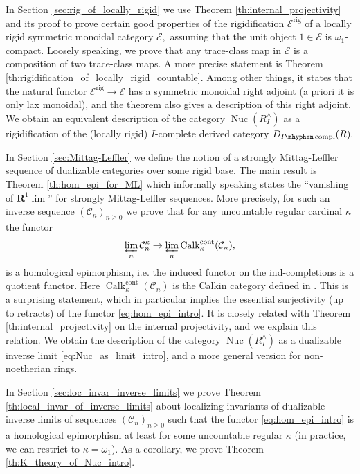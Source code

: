 \documentclass[11pt,leqno]{amsart}
\numberwithin{equation}{section}
\def\bR{{\mathbf R}}
\newcommand{\hy}{\mhyphen}
\newcommand{\prolim}[1][]{\mathop{\varprojlim}\limits_{#1}}
\newcommand{\rig}{\operatorname{rig}}
\newcommand{\Nuc}{\operatorname{Nuc}}
\newcommand{\cont}{\operatorname{cont}}
\newcommand{\cC}{{\mathcal C}}
\newcommand{\cE}{{\mathcal E}}
\newcommand{\Calk}{\operatorname{Calk}}
\newcommand{\compl}{\operatorname{compl}}
\begin{document}
In Section \ref{sec:rig_of_locally_rigid} we use Theorem \ref{th:internal_projectivity} and its proof to prove certain good properties of the rigidification $\cE^{\rig}$ of a locally rigid  symmetric monoidal category $\cE,$ assuming that the unit object $1\in\cE$ is $\omega_1$-compact. Loosely speaking, we prove that any trace-class map in $\cE$ is a composition of two trace-class maps. A more precise statement is Theorem \ref{th:rigidification_of_locally_rigid_countable}. Among other things, it states that the natural functor $\cE^{\rig}\to\cE$ has a symmetric monoidal right adjoint (a priori it is only lax monoidal), and the theorem also gives a description of this right adjoint. We obtain an equivalent description of the category $\Nuc(R^{\wedge}_I)$ as a rigidification of the (locally rigid) $I$-complete derived category $D_{I\hy\compl}(R).$
 
In Section \ref{sec:Mittag-Leffler} we define the notion of a strongly Mittag-Leffler sequence of dualizable categories over some rigid base. The main result is Theorem \ref{th:hom_epi_for_ML} which informally speaking states the ``vanishing of $\bR^1\lim$'' for strongly Mittag-Leffler sequences. More precisely, for such an inverse sequence $(\cC_n)_{n\geq 0}$ we prove that for any uncountable regular cardinal $\kappa$ the functor
\begin{equation}\label{eq:hom_epi_intro}
\prolim[n]\cC_n^{\kappa}\to\prolim[n]\Calk_{\kappa}^{\cont}(\cC_n),
\end{equation} 
is a homological epimorphism, i.e. the induced functor on the ind-completions is a quotient functor. Here $\Calk_{\kappa}^{\cont}(\cC_n)$ is the Calkin category defined in \cite{E24}. This is a surprising statement, which in particular implies the essential surjectivity (up to retracts) of the functor \eqref{eq:hom_epi_intro}. It is closely related with Theorem \ref{th:internal_projectivity} on the internal projectivity, and we explain this relation. We obtain the description of the category $\Nuc(R^{\wedge}_I)$ as a dualizable inverse limit \eqref{eq:Nuc_as_limit_intro}, and a more general version for non-noetherian rings.

In Section \ref{sec:loc_invar_inverse_limits} we prove Theorem \ref{th:local_invar_of_inverse_limits} about localizing invariants of dualizable inverse limits of sequences $(\cC_n)_{n\geq 0}$ such that the functor \eqref{eq:hom_epi_intro} is a homological epimorphism at least for some uncountable regular $\kappa$ (in practice, we can restrict to $\kappa=\omega_1$). As a corollary, we prove Theorem \ref{th:K_theory_of_Nuc_intro}.
\end{document}
